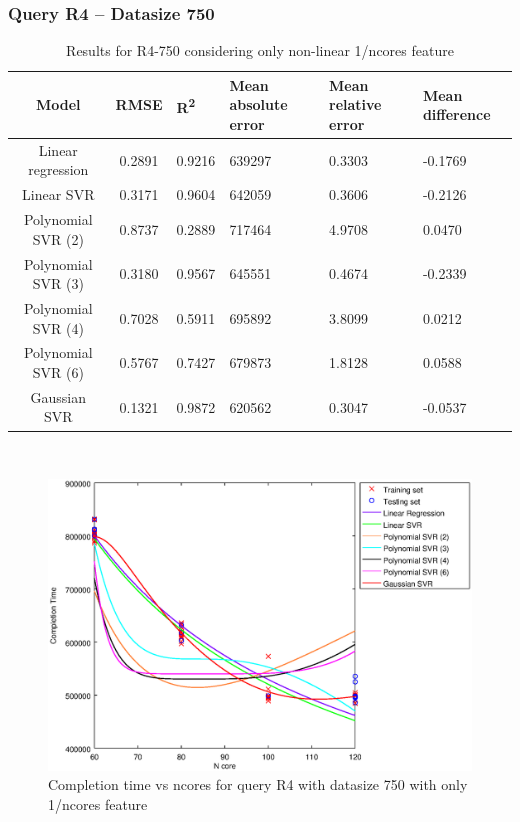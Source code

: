\documentclass[a4paper,11pt]{article}
\begin{document}
\newpage
\subsubsection{Query R4 -- Datasize 750}
\begin{table}[H]
	\centering
	\begin{adjustbox}{center}
		\begin{tabular}{c | c M{1.2cm} M{2.5cm} M{2.5cm} M{1.8cm}}
			Model & RMSE & R\textsuperscript{2} & Mean absolute error & Mean relative error & Mean difference \tabularnewline
			\hline
			Linear regression & 0.2891 & 0.9216 & 639297 & 0.3303 & -0.1769 \\
			Linear SVR & 0.3171 & 0.9604 & 642059 & 0.3606 & -0.2126 \\
			Polynomial SVR (2) & 0.8737 & 0.2889 & 717464 & 4.9708 & 0.0470 \\
			Polynomial SVR (3) & 0.3180 & 0.9567 & 645551 & 0.4674 & -0.2339 \\
			Polynomial SVR (4) & 0.7028 & 0.5911 & 695892 & 3.8099 & 0.0212 \\
			Polynomial SVR (6) & 0.5767 & 0.7427 & 679873 & 1.8128 & 0.0588 \\
			Gaussian SVR & 0.1321 & 0.9872 & 620562 & 0.3047 & -0.0537 \\
		\end{tabular}
	\end{adjustbox}
	\\
	\caption{Results for R4-750 considering only non-linear 1/ncores feature}
	\label{table_R4_prediction_all}
\end{table}

\begin {figure}[hbtp]
\centering
\includegraphics[width=\textwidth]{output/R4_750_ONLY_1_OVER_NCORES/plot_R4_750.eps}
\caption {Completion time vs ncores for query R4 with datasize 750 with only 1/ncores feature}
\end {figure}
\end{document}
